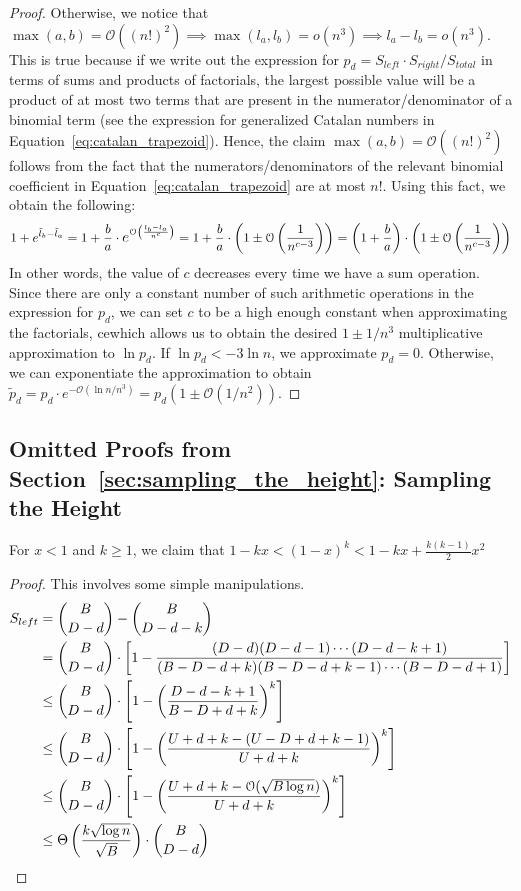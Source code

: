 \begin{proof}
Otherwise, we notice that $\max(a,b) = \mathcal O\left((n!)^2\right)\implies \max(l_a, l_b) = o(n^3)\implies l_a-l_b = o(n^3)$.
This is true because if we write out the expression for $p_d = S_{left}\cdot S_{right}/S_{total}$ in terms of sums and products of factorials,
the largest possible value will be a product of at most two terms that are present in the numerator/denominator of a binomial term
(see the expression for generalized Catalan numbers in Equation~\ref{eq:catalan_trapezoid}).
Hence, the claim $\max(a,b) = \mathcal O\left((n!)^2\right)$ follows from the fact that
the numerators/denominators of the relevant binomial coefficient in Equation~\ref{eq:catalan_trapezoid} are at most $n!$.
Using this fact, we obtain the following:
\[
1+e^{\tilde l_b-\tilde l_a} = 1+\frac ba\cdot \mathlarger e^{\mathcal O\left( \frac{l_b-l_a}{n^c}\right)}
= 1+\frac ba\cdot\left( 1 \pm \mathcal O\left( \frac{1}{n^{c-3}} \right)\right)
= \left( 1+\frac ba\right)\cdot\left( 1 \pm \mathcal O\left( \frac{1}{n^{c-3}} \right)\right)
\]
In other words, the value of $c$ decreases every time we have a sum operation.
Since there are only a constant number of such arithmetic operations in the expression for $p_d$,
we can set $c$ to be a high enough constant when approximating the factorials,
cewhich allows us to obtain the desired $1\pm1/n^3$ multiplicative approximation to $\ln p_d$.
If $\ln p_d < -3\ln n$, we approximate $p_d = 0$.
Otherwise, we can exponentiate the approximation to obtain $\tilde p_d=p_d\cdot e^{-\mathcal O(\ln n/n^3)} = p_d\left( 1\pm\mathcal O(1/n^2)\right)$.
\end{proof}



\subsection{Omitted Proofs from Section~\ref{sec:sampling_the_height}: Sampling the Height}%
\label{sec:appendix_sampling_the_height}
\begin{lemma}
\label{lem:taylor_bound}
For $x < 1$ and $k\ge 1$, we claim that $1-kx < (1-x)^k < 1 - kx + \frac{k(k-1)}{2}x^2$
\end{lemma}


\DLeftBound*
\begin{proof}
This involves some simple manipulations.
\begin{align}
S_{left} &= {{B}\choose{D-d}}-{{B}\choose{D-d-k}}\\
&= {{B}\choose{D-d}}\cdot \left[1-\frac{(D-d)(D-d-1)\cdots(D-d-k+1)}{(B-D-d+k)(B-D-d+k-1)\cdots(B-D-d+1)}\right]\\
&\le {{B}\choose{D-d}}\cdot \left[1-\left(\frac{D-d-k+1}{B-D+d+k}\right)^k\right]\\
&\le {{B}\choose{D-d}}\cdot \left[1-\left(\frac{U+d+k-(U-D+d+k-1)}{U+d+k}\right)^k\right]\\
&\le {{B}\choose{D-d}}\cdot \left[1-\left(\frac{U+d+k-\Bo(\sqrt{B\log n})}{U+d+k}\right)^k\right]\\
&\le \Theta \left( \frac{k\sqrt{\log n}}{\sqrt{B}} \right) \cdot{{B}\choose{D-d}}
\end{align}
\end{proof}


